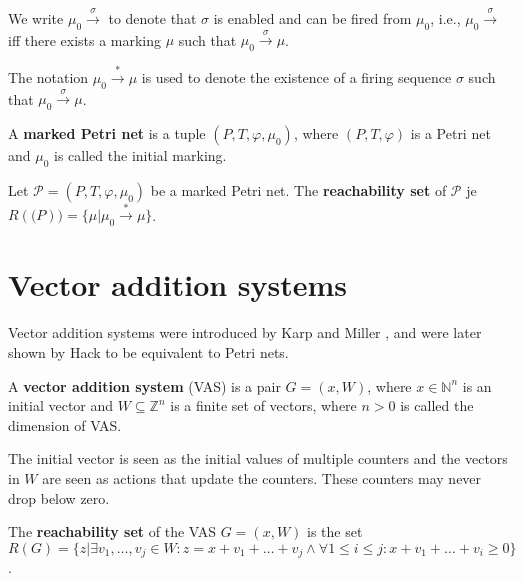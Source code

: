 We write $\mu_0\xrightarrow{\sigma}$ to denote that $\sigma$ is enabled and can be fired from $\mu_0$, i.e., $\mu_0\xrightarrow{\sigma}$ iff there exists a marking $\mu$ such that $\mu_0\xrightarrow{\sigma}\mu$.

The notation $\mu_0\xrightarrow{*}\mu$ is used to denote the existence of a firing sequence $\sigma$ such that $\mu_0\xrightarrow{\sigma}\mu$.

\begin{definition}
  A {\bf marked Petri net} is a tuple $(P,T,\varphi,\mu_0)$, where $(P,T,\varphi)$ is a Petri net and $\mu_0$ is called the initial marking.
\end{definition}

\begin{definition}
  Let $\mathcal P = (P,T,\varphi,\mu_0)$ be a marked Petri net. The {\bf reachability set} of $\mathcal P$ je $R(\mathcal(P)) = \{\mu|\mu_0\xrightarrow{*}\mu\}$.
\end{definition}


\section{Vector addition systems} %
\label{sec:vector_addition_systems}

Vector addition systems were introduced by Karp and Miller \cite{Karp69ParallelProgramSchemata}, and were later shown by Hack \cite{Hack74PetriVAS} to be equivalent to Petri nets.

\begin{definition}
  A {\bf vector addition system} (VAS) is a pair $G = (x, W)$, where $x\in \mathbb N^n$ is an initial vector and $W\subseteq \mathbb Z^n$ is a finite set of vectors, where $n>0$ is called the dimension of VAS.
\end{definition}

The initial vector is seen as the initial values of multiple counters and the vectors in $W$ are seen as actions that update the counters. These counters may never drop below zero. 

\begin{definition}
  The {\bf reachability set} of the VAS $G = (x,W)$ is the set \linebreak $R(G) = \{z | \exists v_1,\ldots,v_j\in W: z=x+v_1+\ldots+v_j \wedge \forall 1\leq i\leq j: x+v_1+\ldots+v_i\geq 0\}$.
\end{definition}

